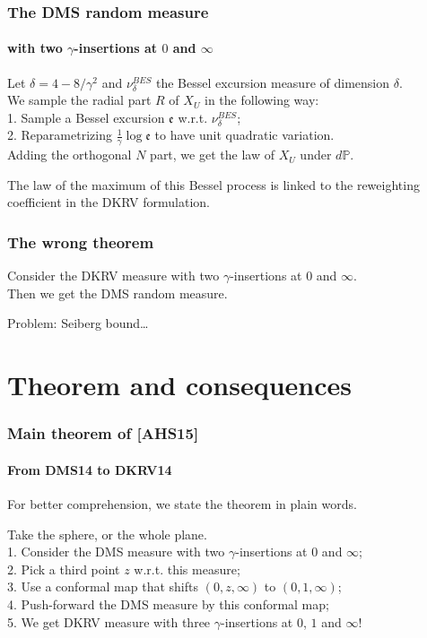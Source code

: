 \documentclass[aspectratio=169]{beamer}
\begin{document}
\begin{frame}
\frametitle{The DMS random measure}
\framesubtitle{with two $\gamma$-insertions at $0$ and $\infty$}
\begin{lemma}
Let $\delta=4-8/\gamma^2$ and $\nu^{BES}_\delta$ the Bessel excursion measure of dimension $\delta$.\\
We sample the radial part $R$ of $X_U$ in the following way:\\
1. Sample a Bessel excursion $\mathfrak{e}$ w.r.t. $\nu^{BES}_\delta$;\\
2. Reparametrizing $\frac{1}{\gamma}\log\mathfrak{e}$ to have unit quadratic variation.\\
Adding the orthogonal $N$ part, we get the law of $X_U$ under $d\mathbb{P}$.
\end{lemma}
The law of the maximum of this Bessel process is linked to the reweighting coefficient in the DKRV formulation.
\end{frame}

\begin{frame}
\frametitle{The wrong theorem}
\begin{theorem}
Consider the DKRV measure with two $\gamma$-insertions at $0$ and $\infty$.\\
Then we get the DMS random measure.
\end{theorem}
Problem: Seiberg bound\dots
\end{frame}


\section{Theorem and consequences}

\begin{frame}
\frametitle{Main theorem of [AHS15]}
\framesubtitle{From DMS14 to DKRV14}
For better comprehension, we state the theorem in plain words.
\begin{theorem}[AHS15]
Take the sphere, or the whole plane.\\
1. Consider the DMS measure with two $\gamma$-insertions at $0$ and $\infty$;\\
2. Pick a third point $z$ w.r.t. this measure;\\
3. Use a conformal map that shifts $(0,z,\infty)$ to $(0,1,\infty)$;\\
4. Push-forward the DMS measure by this conformal map;\\
5. We get DKRV measure with three $\gamma$-insertions at $0$, $1$ and $\infty$!
\end{theorem}
\end{frame}
\end{document}
